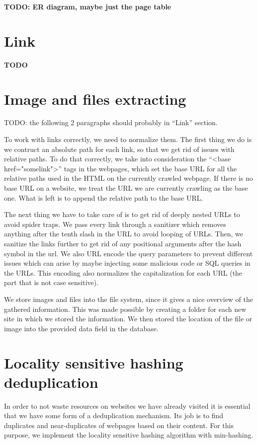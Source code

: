\documentclass[9pt]{IEEEtran}
\begin{document}
\textbf{TODO: ER diagram, maybe just the page table}

\section{Link}



\textbf{TODO}

\section{Image and files extracting}

TODO: the following 2 paragraphs should probably in ``Link'' section.

To work with links correctly, we need to normalize them.
The first thing we do is we contruct an absolute path for each link, so that we get rid of issues with relative paths.
To do that correctly, we take into consideration the ``<base href="somelink">'' tags in the webpages, which set the base URL for all the relative paths used in the HTML on the currently crawled webpage.
If there is no base URL on a website, we treat the URL we are currently crawling as the base one.
What is left is to append the relative path to the base URL.

The next thing we have to take care of is to get rid of deeply nested URLs to avoid spider traps.
We pass every link through a sanitizer which removes anything after the tenth slash in the URL to avoid looping of URLs.
Then, we sanitize the links further to get rid of any positional arguments after the hash symbol in the url.
We also URL encode the query parameters to prevent different issues which can arise by maybe injecting some malicious code or SQL queries in the URLs.
This encoding also normalizes the capitalization for each URL (the part that is not case sensitive).

We store images and files into the file system, since it gives a nice overview of the gathered information. 
This was made possible by creating a folder for each new site in which we stored the information. 
We then stored the location of the file or image into the provided data field in the database.


\section{Locality sensitive hashing deduplication}

In order to not waste resources on websites we have already visited it is essential that we have some form of a deduplication mechanism.
Its job is to find duplicates and near-duplicates of webpages based on their content.
For this purpose, we implement the locality sensitive hashing algorithm \cite{Gionis1999} with min-hashing.
\end{document}

